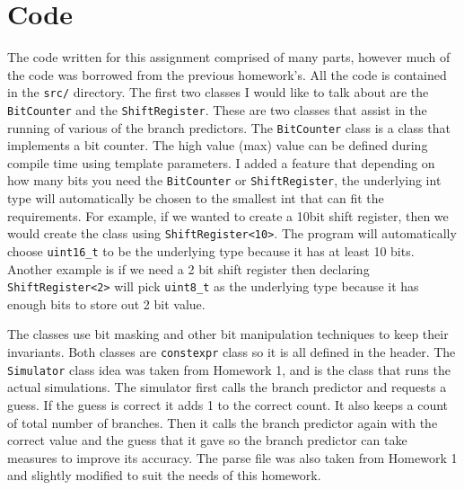 \documentclass{article}
\begin{document}
    \section{Code}
    The code written for this assignment comprised of many parts, however much of the code was borrowed from the previous homework’s. All the code is contained in the \texttt{src/} directory. The first two classes I would like to talk about are the \texttt{BitCounter} and the \texttt{ShiftRegister}. These are two classes that assist in the running of various of the branch predictors. The \texttt{BitCounter} class is a class that implements a bit counter. The high value (max) value can be defined during compile time using template parameters. I added a feature that depending on how many bits you need the \texttt{BitCounter} or \texttt{ShiftRegister}, the underlying int type will automatically be chosen to the smallest int that can fit the requirements. For example, if we wanted to create a 10bit shift register, then we would create the class using \texttt{ShiftRegister<10>}. The program will automatically choose \texttt{uint16\_t} to be the underlying type because it has at least 10 bits. Another example is if we need a 2 bit shift register then declaring \texttt{ShiftRegister<2>} will pick \texttt{uint8\_t} as the underlying type because it has enough bits to store out 2 bit value. \par
    The classes use bit masking and other bit manipulation techniques to keep their invariants. Both classes are \texttt{constexpr} class so it is all defined in the header. The \texttt{Simulator} class idea was taken from Homework 1, and is the class that runs the actual simulations. The simulator first calls the branch predictor and requests a guess. If the guess is correct it adds 1 to the correct count. It also keeps a count of total number of branches. Then it calls the branch predictor again with the correct value and the guess that it gave so the branch predictor can take measures to improve its accuracy. The parse file was also taken from Homework 1 and slightly modified to suit the needs of this homework. \par
\end{document}

